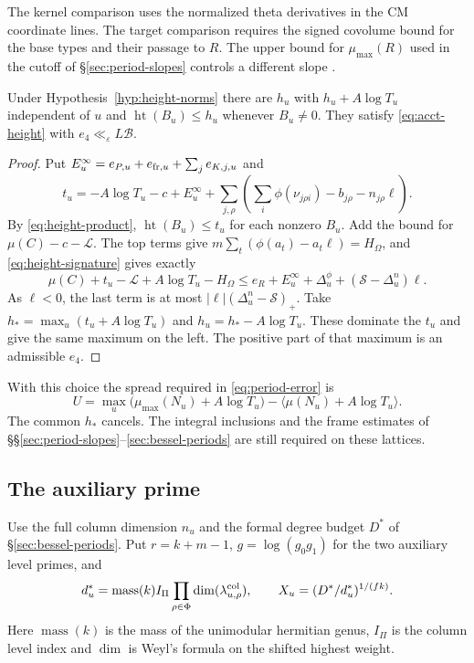 The kernel comparison uses the normalized theta derivatives in the CM
coordinate lines. The target comparison requires the signed covolume
bound for the base types and their passage to $R$. The upper bound for
$\mu_{\max}(R)$ used in the cutoff of \S\ref{sec:period-slopes} controls
a different slope \citep[Hypotheses~15.10--15.12, 15.16, 15.18
and Theorem~15.70]{adriazola-grh}.

\begin{theorem}\label{thm:height-account}
Under Hypothesis~\ref{hyp:height-norms} there are $h_u$ with
$h_u+A\log T_u$ independent of $u$ and $\operatorname{ht}(B_u)\le h_u$
whenever $B_u\ne0$. They satisfy \eqref{eq:acct-height} with
$e_4\ll_\varepsilon L\mathcal B$.
\end{theorem}

\begin{proof}
Put $E_u^{\infty}=e_{P,u}+e_{{\rm fr},u}+\sum_j e_{K,j,u}$ and
\[
 t_u=-A\log T_u-c+E_u^{\infty}+
      \sum_{j,\rho}\left(\sum_i\phi(\nu_{j\rho i})-b_{j\rho}
                                                   -n_{j\rho}\ell\right).
\]
By \eqref{eq:height-product}, $\operatorname{ht}(B_u)\le t_u$ for
each nonzero $B_u$. Add the bound for $\mu(C)-c-\mathcal L$.
The top terms give $m\sum_t(\phi(a_t)-a_t\ell)=H_\Omega$, and
\eqref{eq:height-signature} gives exactly
\[
 \mu(C)+t_u-\mathcal L+A\log T_u-H_\Omega
 \le e_R+E_u^\infty+\Delta_u^\phi+(\mathcal S-\Delta_u^n)\ell .
\]
As $\ell<0$, the last term is at most $|\ell|(\Delta_u^n-\mathcal S)_+$.
Take $h_*=\max_u(t_u+A\log T_u)$ and $h_u=h_*-A\log T_u$.
These dominate the $t_u$ and give the same maximum on the left.
The positive part of that maximum is an admissible $e_4$.
\end{proof}

With this choice the spread required in \eqref{eq:period-error} is
\[
 U=\max_u\bigl(\mu_{\max}(N_u)+A\log T_u\bigr)
                      -\langle\mu(N_u)+A\log T_u\rangle.
\]
The common $h_*$ cancels. The integral inclusions and the frame
estimates of \S\S\ref{sec:period-slopes}--\ref{sec:bessel-periods}
are still required on these lattices.

\subsection{The auxiliary prime}

Use the full column dimension $n_u$ and the formal degree budget $D^*$
of \S\ref{sec:bessel-periods}. Put $r=k+m-1$, $g=\log(g_0g_1)$ for
the two auxiliary level primes, and
\[
 d_u^*=\operatorname{mass}(k)I_\Pi
       \prod_{\rho\in\Phi}\dim(\lambda^{\rm col}_{u,\rho}),\qquad
 X_u=(D^*/d_u^*)^{1/(fk)} .
\]
Here $\operatorname{mass}(k)$ is the mass of the unimodular hermitian
genus, $I_\Pi$ is the column level index and $\dim$ is Weyl's formula
on the shifted highest weight.

